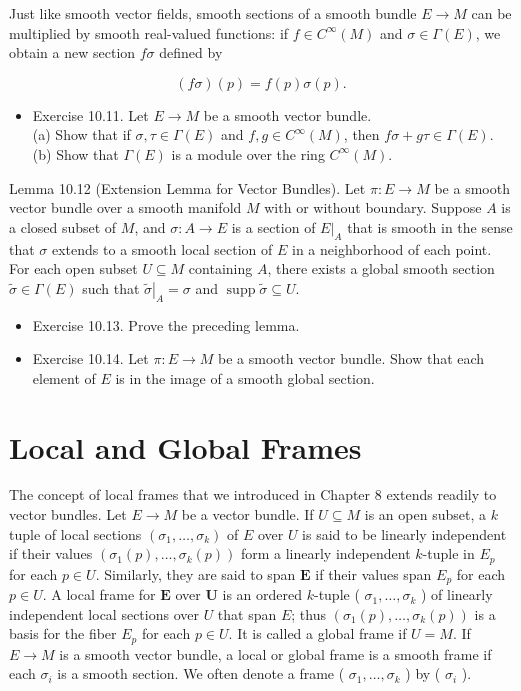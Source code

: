 \documentclass[10pt]{article}
\begin{document}
Just like smooth vector fields, smooth sections of a smooth bundle $E \rightarrow M$ can be multiplied by smooth real-valued functions: if $f \in C^{\infty}(M)$ and $\sigma \in \Gamma(E)$, we obtain a new section $f \sigma$ defined by

$$
(f \sigma)(p)=f(p) \sigma(p) .
$$

\begin{itemize}
  \item Exercise 10.11. Let $E \rightarrow M$ be a smooth vector bundle.\\
(a) Show that if $\sigma, \tau \in \Gamma(E)$ and $f, g \in C^{\infty}(M)$, then $f \sigma+g \tau \in \Gamma(E)$.\\
(b) Show that $\Gamma(E)$ is a module over the ring $C^{\infty}(M)$.
\end{itemize}

Lemma 10.12 (Extension Lemma for Vector Bundles). Let $\pi: E \rightarrow M$ be a smooth vector bundle over a smooth manifold $M$ with or without boundary. Suppose $A$ is a closed subset of $M$, and $\sigma: A \rightarrow E$ is a section of $\left.E\right|_{A}$ that is smooth in the sense that $\sigma$ extends to a smooth local section of $E$ in a neighborhood of each point. For each open subset $U \subseteq M$ containing $A$, there exists a global smooth section $\widetilde{\sigma} \in \Gamma(E)$ such that $\left.\widetilde{\sigma}\right|_{A}=\sigma$ and $\operatorname{supp} \widetilde{\sigma} \subseteq U$.

\begin{itemize}
  \item Exercise 10.13. Prove the preceding lemma.
  \item Exercise 10.14. Let $\pi: E \rightarrow M$ be a smooth vector bundle. Show that each element of $E$ is in the image of a smooth global section.
\end{itemize}

\section*{Local and Global Frames}
The concept of local frames that we introduced in Chapter 8 extends readily to vector bundles. Let $E \rightarrow M$ be a vector bundle. If $U \subseteq M$ is an open subset, a $k$ tuple of local sections $\left(\sigma_{1}, \ldots, \sigma_{k}\right)$ of $E$ over $U$ is said to be linearly independent if their values $\left(\sigma_{1}(p), \ldots, \sigma_{k}(p)\right)$ form a linearly independent $k$-tuple in $E_{p}$ for each $p \in U$. Similarly, they are said to span $\boldsymbol{E}$ if their values span $E_{p}$ for each $p \in U$. A local frame for $\boldsymbol{E}$ over $\boldsymbol{U}$ is an ordered $k$-tuple ( $\sigma_{1}, \ldots, \sigma_{k}$ ) of linearly independent local sections over $U$ that span $E$; thus $\left(\sigma_{1}(p), \ldots, \sigma_{k}(p)\right)$ is a basis for the fiber $E_{p}$ for each $p \in U$. It is called a global frame if $U=M$. If $E \rightarrow M$ is a smooth vector bundle, a local or global frame is a smooth frame if each $\sigma_{i}$ is a smooth section. We often denote a frame ( $\sigma_{1}, \ldots, \sigma_{k}$ ) by ( $\sigma_{i}$ ).
\end{document}
